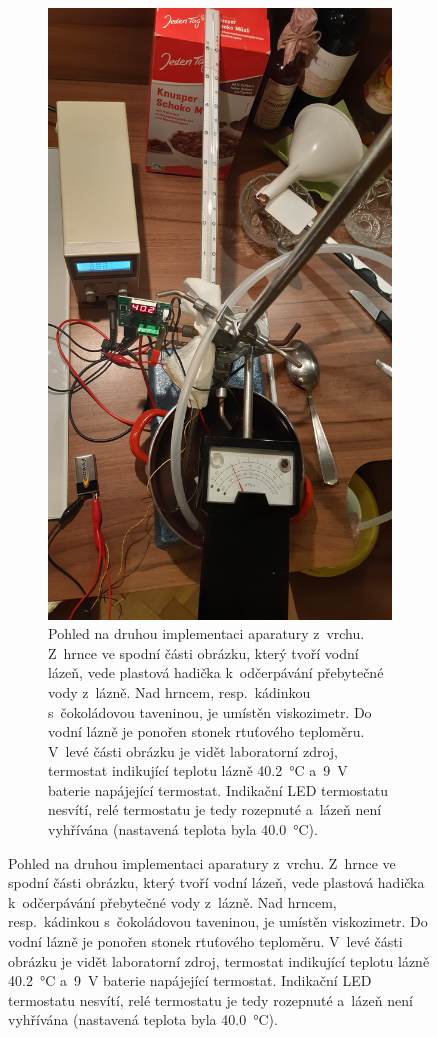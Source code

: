 \documentclass[12pt]{article}
\begin{document}
\begin{figure}[h!]
    \begin{subfigure}[t]{.45\textwidth}
        \includegraphics[angle = 270, width = \textwidth]{prilohy/aparatura_vrch.jpg}
        \caption{Pohled na druhou implementaci aparatury z~vrchu. Z~hrnce ve spodní části obrázku, který tvoří vodní lázeň, vede plastová hadička k~odčerpávání přebytečné vody z~lázně. Nad hrncem, resp.~kádinkou s~čokoládovou taveninou, je umístěn viskozimetr. Do vodní lázně je ponořen stonek rtuťového teploměru. V~levé části obrázku je vidět laboratorní zdroj, termostat indikující teplotu lázně \SI{40,2}{\degreeCelsius} a~\SI{9}{\volt} baterie napájející termostat. Indikační LED termostatu nesvítí, relé termostatu je tedy rozepnuté a~lázeň není vyhřívána (nastavená teplota byla \SI{40,0}{\degreeCelsius}).}

\end{subfigure}
\end{figure}
\end{document}
